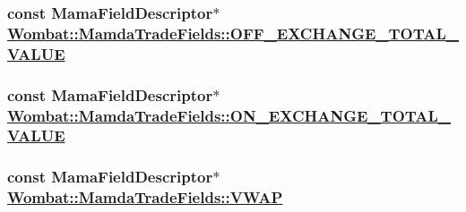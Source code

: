\hypertarget{classWombat_1_1MamdaTradeFields_717ae134d77d96f906ab623f331b5d9b}{
\subsubsection[OFF\_\-EXCHANGE\_\-TOTAL\_\-VALUE]{\setlength{\rightskip}{0pt plus 5cm}const Mama\-Field\-Descriptor$\ast$ \hyperlink{classWombat_1_1MamdaTradeFields_717ae134d77d96f906ab623f331b5d9b}{Wombat::Mamda\-Trade\-Fields::OFF\_\-EXCHANGE\_\-TOTAL\_\-VALUE}}}
\label{classWombat_1_1MamdaTradeFields_717ae134d77d96f906ab623f331b5d9b}


\hypertarget{classWombat_1_1MamdaTradeFields_60c81d33667f4368dbc465b043d69837}{
\subsubsection[ON\_\-EXCHANGE\_\-TOTAL\_\-VALUE]{\setlength{\rightskip}{0pt plus 5cm}const Mama\-Field\-Descriptor$\ast$ \hyperlink{classWombat_1_1MamdaTradeFields_60c81d33667f4368dbc465b043d69837}{Wombat::Mamda\-Trade\-Fields::ON\_\-EXCHANGE\_\-TOTAL\_\-VALUE}}}
\label{classWombat_1_1MamdaTradeFields_60c81d33667f4368dbc465b043d69837}


\hypertarget{classWombat_1_1MamdaTradeFields_42571181bda9b1960596eb43f4bed4bd}{
\subsubsection[VWAP]{\setlength{\rightskip}{0pt plus 5cm}const Mama\-Field\-Descriptor$\ast$ \hyperlink{classWombat_1_1MamdaTradeFields_42571181bda9b1960596eb43f4bed4bd}{Wombat::Mamda\-Trade\-Fields::VWAP}}}
\label{classWombat_1_1MamdaTradeFields_42571181bda9b1960596eb43f4bed4bd}


